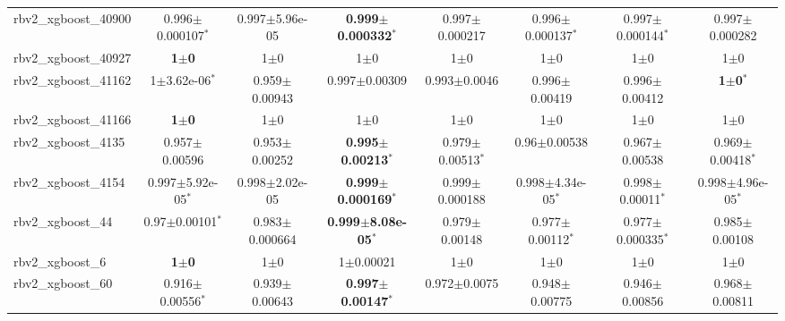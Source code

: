 \begin{table}[t]
\begin{center}
\begin{tabular}{lccccccc}
rbv2\_xgboost\_40900 & 0.996$\pm$0.000107$^{*}$ & 0.997$\pm$5.96e-05 & \textbf{0.999$\pm$0.000332}$^{*}$ & 0.997$\pm$0.000217 & 0.996$\pm$0.000137$^{*}$ & 0.997$\pm$0.000144$^{*}$ & 0.997$\pm$0.000282 \\
rbv2\_xgboost\_40927 & \textbf{1$\pm$0} & 1$\pm$0 & 1$\pm$0 & 1$\pm$0 & 1$\pm$0 & 1$\pm$0 & 1$\pm$0 \\
rbv2\_xgboost\_41162 & 1$\pm$3.62e-06$^{*}$ & 0.959$\pm$0.00943 & 0.997$\pm$0.00309 & 0.993$\pm$0.0046 & 0.996$\pm$0.00419 & 0.996$\pm$0.00412 & \textbf{1$\pm$0}$^{*}$ \\
rbv2\_xgboost\_41166 & \textbf{1$\pm$0} & 1$\pm$0 & 1$\pm$0 & 1$\pm$0 & 1$\pm$0 & 1$\pm$0 & 1$\pm$0 \\
rbv2\_xgboost\_4135 & 0.957$\pm$0.00596 & 0.953$\pm$0.00252 & \textbf{0.995$\pm$0.00213}$^{*}$ & 0.979$\pm$0.00513$^{*}$ & 0.96$\pm$0.00538 & 0.967$\pm$0.00538 & 0.969$\pm$0.00418$^{*}$ \\
rbv2\_xgboost\_4154 & 0.997$\pm$5.92e-05$^{*}$ & 0.998$\pm$2.02e-05 & \textbf{0.999$\pm$0.000169}$^{*}$ & 0.999$\pm$0.000188 & 0.998$\pm$4.34e-05$^{*}$ & 0.998$\pm$0.00011$^{*}$ & 0.998$\pm$4.96e-05$^{*}$ \\
rbv2\_xgboost\_44 & 0.97$\pm$0.00101$^{*}$ & 0.983$\pm$0.000664 & \textbf{0.999$\pm$8.08e-05}$^{*}$ & 0.979$\pm$0.00148 & 0.977$\pm$0.00112$^{*}$ & 0.977$\pm$0.000335$^{*}$ & 0.985$\pm$0.00108 \\
rbv2\_xgboost\_6 & \textbf{1$\pm$0} & 1$\pm$0 & 1$\pm$0.00021 & 1$\pm$0 & 1$\pm$0 & 1$\pm$0 & 1$\pm$0 \\
rbv2\_xgboost\_60 & 0.916$\pm$0.00556$^{*}$ & 0.939$\pm$0.00643 & \textbf{0.997$\pm$0.00147}$^{*}$ & 0.972$\pm$0.0075 & 0.948$\pm$0.00775 & 0.946$\pm$0.00856 & 0.968$\pm$0.00811 \\
\hline
\end{tabular}
\end{center}
\end{table}